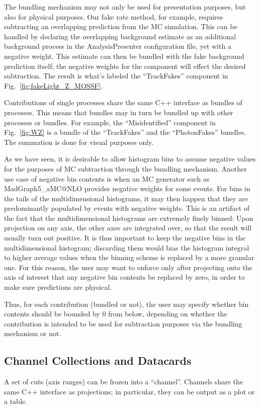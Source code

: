 The bundling mechanism may not only be used for presentation purposes, but also for physical purposes. Our fake rate method, for example, requires subtracting an overlapping prediction from the \ttbar MC simulation. This can be handled by declaring the overlapping \ttbar background estimate as an additional background process in the AnalysisPresenter configuration file, yet with a negative weight. This estimate can then be bundled with the fake background prediction itself; the negative weights for the \ttbar component will effect the desired subtraction. The result is what's labeled the ``TrackFakes'' component in Fig.~\ref{fig:fakeLight_Z_MOSSF}.

Contributions of single processes share the same C++ interface as bundles of processes. This means that bundles may in turn be bundled up with other processes or bundles. For example, the ``Misidentified'' component in Fig.~\ref{fig:WZ} is a bundle of the ``TrackFakes'' and the ``PhotonFakes'' bundles. The summation is done for visual purposes only.

As we have seen, it is desirable to allow histogram bins to assume negative values for the purposes of MC subtraction through the bundling mechanism. Another use case of negative bin contents is when an MC generator such as MadGraph5\_aMC@NLO \cite{Alwall:2014hca} provides negative weights for some events. For bins in the tails of the multidimensional histograms, it may then happen that they are predominantly populated by events with negative weights. This is an artifact of the fact that the multidimensional histograms are extremely finely binned: Upon projection on any axis, the other axes are integrated over, so that the result will usually turn out positive. It is thus important to keep the negative bins in the multidimensional histogram; discarding them would bias the histogram integral to higher average values when the binning scheme is replaced by a more granular one. For this reason, the user may want to enforce only after projecting onto the axis of interest that any negative bin contents be replaced by zero, in order to make sure predictions are physical.

Thus, for each contribution (bundled or not), the user may specify whether bin contents should be bounded by 0 from below, depending on whether the contribution is intended to be used for subtraction purposes via the bundling mechanism or not.

\subsection{Channel Collections and Datacards}
A set of cuts (axis ranges) can be frozen into a ``channel''. Channels share the same C++ interface as projections; in particular, they can be output as a plot or a table.

